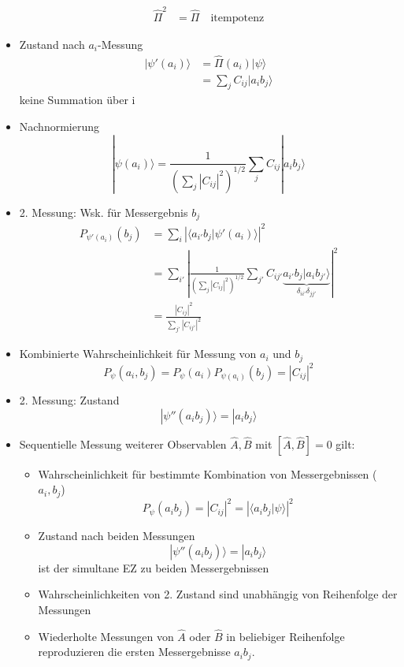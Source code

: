 \documentclass[10pt,article,colorback,accentcolor=tud9d]{scrartcl}
\begin{document}
\begin{itemize}
\begin{align}
      \hat{\Pi}^2&=\hat{\Pi} \quad \text{itempotenz}
    \end{align}
  \item Zustand nach $a_i$-Messung
    \begin{align}
      |\psi'(a_i)\rangle&=\hat{\Pi}(a_i)|\psi\rangle\\
      &=\sum_jC_{ij}|a_ib_j\rangle
    \end{align}
    keine Summation über i
  \item Nachnormierung 
    \begin{equation}
    |\psi(a_i)\rangle=\frac{1}{\left(\sum_j|C_{ij}|^2\right)^{1/2}}\sum_jC_{ij}|a_ib_j\rangle
    \end{equation}
  \item 2. Messung: Wsk. für Messergebnis $b_j$
    \begin{align}
      P_{\psi'(a_i)}(b_j)&=\sum_i\left|\langle a_{i'}b_j|\psi'(a_i)\rangle\right|^2\\
      &=\sum_{i'}\left|\frac{1}{\left(\sum_j |C_{ij}|^2\right)^{1/2}}\sum_{j'}C_{ij'}\underbrace{a_{i'}b_j|a_ib_{j'}\rangle}_{\delta_{ii'}\delta_{jj'}}\right|^2\\
      &=\frac{|C_{ij}|^2}{\sum_{j'}|C_{ij'}|^2}
    \end{align}
  \item Kombinierte Wahrscheinlichkeit für Messung von $a_i$ und $b_j$
    \begin{equation}
    P_\psi(a_i,b_j)=P_\psi(a_i)P_{\psi(a_i)}(b_j)=|C_{ij}|^2
    \end{equation}
  \item 2. Messung: Zustand
    \begin{equation}
    |\psi''(a_ib_j)\rangle=|a_ib_j\rangle
    \end{equation}
  \item Sequentielle Messung weiterer Observablen $\hat{A},\hat{B}$ mit $[\hat{A},\hat{B}]=0$ gilt:
    \begin{itemize}
      \item Wahrscheinlichkeit für bestimmte Kombination von Messergebnissen ($a_i,b_j$)
        \begin{equation}
        P_\psi(a_ib_j)=|C_{ij}|^2=\left|\langle a_ib_j|\psi\rangle\right|^2
        \end{equation}
      \item Zustand nach beiden Messungen
        \begin{equation}
        |\psi''(a_ib_j)\rangle=|a_ib_j\rangle
        \end{equation}
        ist der simultane EZ zu beiden Messergebnissen
      \item Wahrscheinlichkeiten von 2. Zustand sind unabhängig von Reihenfolge der Messungen
      \item Wiederholte Messungen von $\hat{A}$ oder $\hat{B}$ in beliebiger Reihenfolge reproduzieren die ersten Messergebnisse $a_ib_j$.
    \end{itemize}
\end{itemize}
\end{document}
